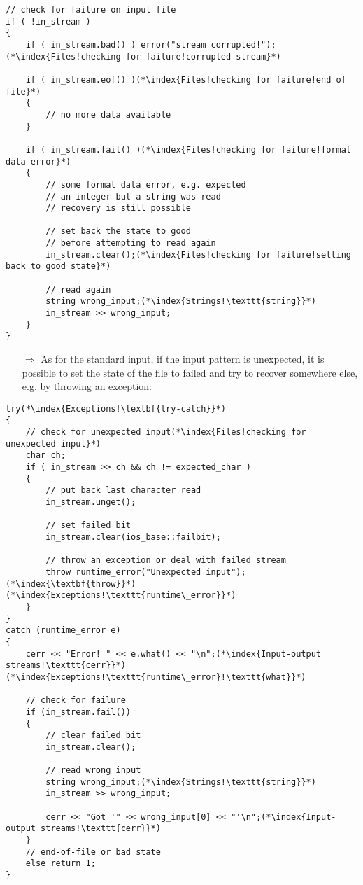\documentclass[10pt]{book}
\begin{document}
\begin{lstlisting}
// check for failure on input file
if ( !in_stream )
{
    if ( in_stream.bad() ) error("stream corrupted!");(*\index{Files!checking for failure!corrupted stream}*)
    
    if ( in_stream.eof() )(*\index{Files!checking for failure!end of file}*)
    { 
        // no more data available
    }
    
    if ( in_stream.fail() )(*\index{Files!checking for failure!format data error}*)
    {
        // some format data error, e.g. expected
        // an integer but a string was read
        // recovery is still possible
        
        // set back the state to good 
        // before attempting to read again
        in_stream.clear();(*\index{Files!checking for failure!setting back to good state}*)
        
        // read again
        string wrong_input;(*\index{Strings!\texttt{string}}*)
        in_stream >> wrong_input;
    }
}
\end{lstlisting}
\begin{enumerate}
\item[$\Rightarrow$] As for the standard input, if the input pattern is unexpected, it is possible to set the state of the file to failed and try to recover somewhere else, e.g. by throwing an exception:
\end{enumerate}
\begin{lstlisting}
try(*\index{Exceptions!\textbf{try-catch}}*)
{
    // check for unexpected input(*\index{Files!checking for unexpected input}*)
    char ch;
    if ( in_stream >> ch && ch != expected_char )
    {
        // put back last character read
        in_stream.unget();
        
        // set failed bit
        in_stream.clear(ios_base::failbit);
    
        // throw an exception or deal with failed stream
        throw runtime_error("Unexpected input");(*\index{\textbf{throw}}*)(*\index{Exceptions!\texttt{runtime\_error}}*)
    }
}
catch (runtime_error e)
{
    cerr << "Error! " << e.what() << "\n";(*\index{Input-output streams!\texttt{cerr}}*)(*\index{Exceptions!\texttt{runtime\_error}!\texttt{what}}*)
            
    // check for failure
    if (in_stream.fail())
    {
        // clear failed bit
        in_stream.clear();
                
        // read wrong input
        string wrong_input;(*\index{Strings!\texttt{string}}*)
        in_stream >> wrong_input;
                    
        cerr << "Got '" << wrong_input[0] << "'\n";(*\index{Input-output streams!\texttt{cerr}}*)
    }
    // end-of-file or bad state
    else return 1;
}
\end{lstlisting}
\end{document}
